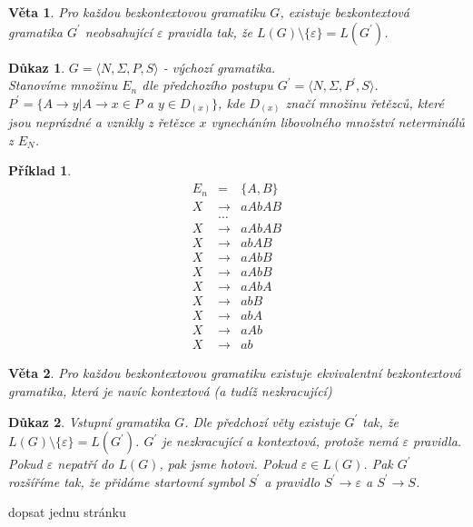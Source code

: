 \documentclass[10pt, a4paper, titlepage]{article}
\theoremstyle{note}
\newtheorem{veta}{\textbf{Věta}}
\newtheorem{dukaz}{\textbf{Důkaz}}
\newtheorem{priklad}{\textbf{Příklad}}
\begin{document}
\begin{veta}
Pro každou bezkontextovou gramatiku $G$, existuje bezkontextová gramatika $G^{'}$ neobsahující $\varepsilon$ pravidla tak, že $L(G) \setminus \lbrace \varepsilon \rbrace = L(G^{'})$.
\end{veta}

\begin{dukaz}
$G = \langle N, \Sigma, P,S \rangle$ - výchozí gramatika.\\
Stanovíme množinu $E_{n}$ dle předchozího postupu $G^{'} = \langle N, \Sigma, P^{'},S \rangle$.
$P^{'} = \lbrace A \rightarrow y|A \rightarrow x \in P$ a $y \in D_{(x)} \rbrace$, kde $D_{(x)}$ značí množinu řetězců, které jsou neprázdné 
a vznikly z řetězce $x$ vynecháním libovolného množství neterminálů z $E_{N}$.
\end{dukaz}

\begin{priklad}
\begin{eqnarray*}
E_{n} &=& \lbrace A, B \rbrace \\
X &\rightarrow& aAbAB \\
&\ldots& \\
X &\rightarrow& aAbAB \\
X &\rightarrow& abAB \\
X &\rightarrow& aAbB \\
X &\rightarrow& aAbB \\
X &\rightarrow& aAbA \\
X &\rightarrow& abB \\
X &\rightarrow& abA \\
X &\rightarrow& aAb \\
X &\rightarrow& ab
\end{eqnarray*}
\end{priklad}

\begin{veta}
Pro každou bezkontextovou gramatiku existuje ekvivalentní bezkontextová gramatika, která je navíc kontextová (a tudíž nezkracující)
\end{veta}

\begin{dukaz}
Vstupní gramatika $G$. Dle předchozí věty existuje $G^{'}$ tak, že $L(G) \setminus \lbrace \varepsilon \rbrace = L(G^{'})$. 
$G^{'}$ je nezkracující a kontextová, protože nemá $\varepsilon$ pravidla. Pokud $\varepsilon$ nepatří do $L(G)$, pak jsme hotovi.
Pokud $\varepsilon \in L(G)$. Pak $G^{'}$ rozšíříme tak, že přidáme startovní symbol $S^{'}$ 
a pravidlo $S^{'} \rightarrow \varepsilon$ a $S^{'} \rightarrow S$.
\end{dukaz}
dopsat jednu stránku
\end{document}
